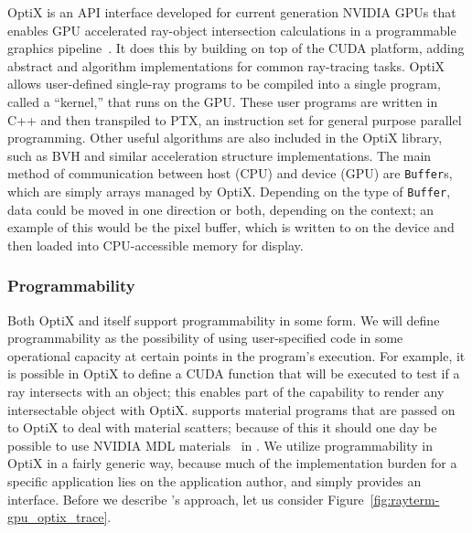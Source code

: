 OptiX is an API interface developed for current generation NVIDIA GPUs that enables GPU accelerated ray-object intersection calculations in a programmable graphics pipeline~\cite{parker2010optix, nvidia2019optixdoc}.
It does this by building on top of the CUDA platform, adding abstract and algorithm implementations for common ray-tracing tasks.
OptiX allows user-defined single-ray programs to be compiled into a single program, called a ``kernel,'' that runs on the GPU.
These user programs are written in C++ and then transpiled to PTX, an instruction set for general purpose parallel programming.
Other useful algorithms are also included in the OptiX library, such as BVH and similar acceleration structure implementations.
The main method of communication between host (CPU) and device (GPU) are \texttt{Buffer}s, which are simply arrays managed by OptiX.
Depending on the type of \texttt{Buffer}, data could be moved in one direction or both, depending on the context; an example of this would be the pixel buffer, which is written to on the device and then loaded into CPU-accessible memory for display.

\subsubsection{Programmability} \label{ch:methods:renderer:parallel:program}

Both OptiX and \name{} itself support programmability in some form.
We will define programmability as the possibility of using user-specified code in some operational capacity at certain points in the program's execution.
For example, it is possible in OptiX to define a CUDA function that will be executed to test if a ray intersects with an object; this enables part of the capability to render any intersectable object with OptiX.
 \name{} supports material programs that are passed on to OptiX to deal with material scatters; because of this it should one day be possible to use NVIDIA MDL materials~\cite{nvidia2015mdl} in \name{}.
We utilize programmability in OptiX in a fairly generic way, because much of the implementation burden for a specific application lies on the application author, and \name{} simply provides an interface.
Before we describe \name{}'s approach, let us consider Figure~\ref{fig:rayterm-gpu_optix_trace}.

